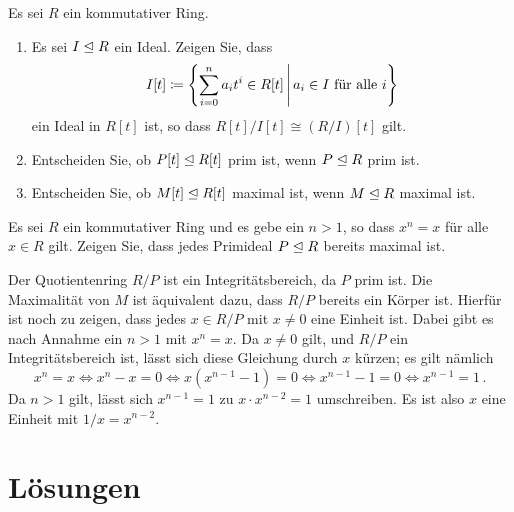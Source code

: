 \documentclass[a4paper, 10pt]{scrartcl}
\begin{document}
\begin{question}
  Es sei $R$ ein kommutativer Ring.
  \begin{enumerate}
    \item
      Es sei $I \mathrel{\trianglelefteq} R$ ein Ideal.
      Zeigen Sie, dass
      \[
                  I[t]
        \defined  \left\{
                    \sum_{i=0}^n a_i t^i \in R[t]
                  \suchthat*
                    \text{$a_i \in I$ für alle $i$}
                  \right\}
      \]
      ein Ideal in $R[t]$ ist, so dass $R[t]/I[t] \cong (R/I)[t]$ gilt.
    \item
      Entscheiden Sie, ob $P[t] \mathrel{\trianglelefteq} R[t]$ prim ist, wenn $P \mathrel{\trianglelefteq} R$ prim ist.
    \item
      Entscheiden Sie, ob $M[t] \mathrel{\trianglelefteq} R[t]$ maximal ist, wenn $M \mathrel{\trianglelefteq} R$ maximal ist.
  \end{enumerate}
\end{question}

\begin{question}
  Es sei $R$ ein kommutativer Ring und es gebe ein $n > 1$, so dass $x^n = x$ für alle $x \in R$ gilt.
  Zeigen Sie, dass jedes Primideal $P \mathrel{\trianglelefteq} R$ bereits maximal ist.
\end{question}

\begin{solution}
  Der Quotientenring $R/P$ ist ein Integritätsbereich, da $P$ prim ist.
  Die Maximalität von $M$ ist äquivalent dazu, dass $R/P$ bereits ein Körper ist.
  Hierfür ist noch zu zeigen, dass jedes $x \in R/P$ mit $x \neq 0$ eine Einheit ist.
  Dabei gibt es nach Annahme ein $n > 1$ mit $x^n = x$.
  Da $x \neq 0$ gilt, und $R/P$ ein Integritätsbereich ist, lässt sich diese Gleichung durch $x$ kürzen;
  es gilt nämlich
  \[
          x^n = x
    \iff  x^n - x = 0
    \iff  x(x^{n-1} - 1) = 0
    \iff  x^{n-1} - 1 = 0
    \iff  x^{n-1} = 1 \,.
  \]
  Da $n > 1$ gilt, lässt sich $x^{n-1} = 1$ zu $x \cdot x^{n-2} = 1$ umschreiben.
  Es ist also $x$ eine Einheit mit $1/x = x^{n-2}$.
\end{solution}





\pagebreak





\section*{Lösungen}

\printsolutions
\end{document}
